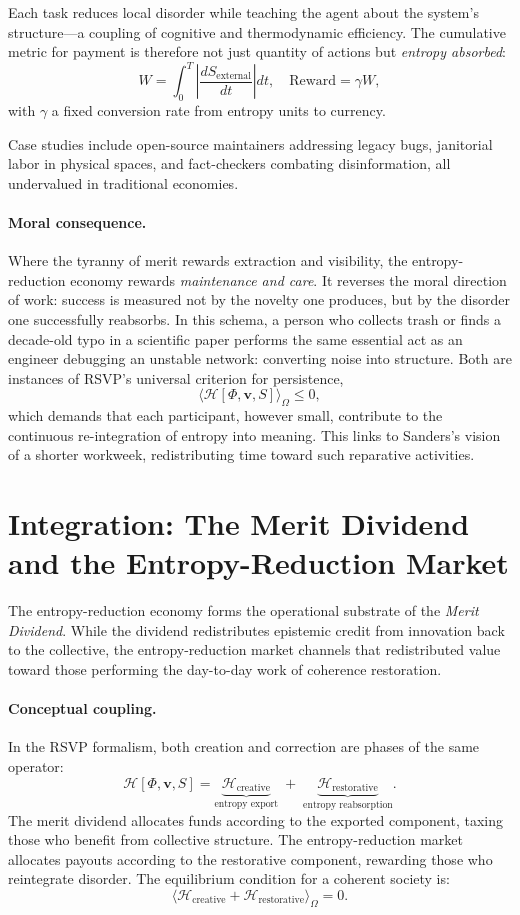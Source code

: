 \documentclass[12pt]{article}
\begin{document}
Each task reduces local disorder while teaching the agent about the system’s structure—a coupling of cognitive and thermodynamic efficiency. The cumulative metric for payment is therefore not just quantity of actions but \emph{entropy absorbed}:
\[
W = \int_0^T \!\! \left|\frac{dS_{\text{external}}}{dt}\right| dt,
\quad \text{Reward} = \gamma W,
\]
with $\gamma$ a fixed conversion rate from entropy units to currency.

Case studies include open-source maintainers addressing legacy bugs, janitorial labor in physical spaces, and fact-checkers combating disinformation, all undervalued in traditional economies.

\paragraph{Moral consequence.}
Where the tyranny of merit rewards extraction and visibility, the entropy-reduction economy rewards \emph{maintenance and care}. It reverses the moral direction of work: success is measured not by the novelty one produces, but by the disorder one successfully reabsorbs. In this schema, a person who collects trash or finds a decade-old typo in a scientific paper performs the same essential act as an engineer debugging an unstable network: converting noise into structure. Both are instances of RSVP’s universal criterion for persistence,
\[
\langle \mathcal{H}[\Phi,\mathbf{v},S] \rangle_\Omega \le 0,
\]
which demands that each participant, however small, contribute to the continuous re-integration of entropy into meaning. This links to Sanders’s vision of a shorter workweek, redistributing time toward such reparative activities.

\section{Integration: The Merit Dividend and the Entropy-Reduction Market}
\label{sec:entropy-labor-merit}
The entropy-reduction economy forms the operational substrate of the \emph{Merit Dividend}. While the dividend redistributes epistemic credit from innovation back to the collective, the entropy-reduction market channels that redistributed value toward those performing the day-to-day work of coherence restoration.

\paragraph{Conceptual coupling.}
In the RSVP formalism, both creation and correction are phases of the same operator:
\[
\mathcal{H}[\Phi,\mathbf{v},S] = \underbrace{\mathcal{H}_\text{creative}}_{\text{entropy export}} \;+\; \underbrace{\mathcal{H}_\text{restorative}}_{\text{entropy reabsorption}}.
\]
The merit dividend allocates funds according to the exported component, taxing those who benefit from collective structure. The entropy-reduction market allocates payouts according to the restorative component, rewarding those who reintegrate disorder. The equilibrium condition for a coherent society is:
\[
\langle \mathcal{H}_\text{creative} + \mathcal{H}_\text{restorative} \rangle_\Omega = 0.
\]
\end{document}

